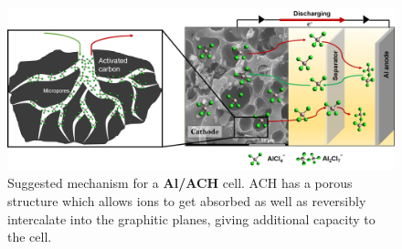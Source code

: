  \begin{figure}[tbh!]
  \centering
  \includegraphics[width=\textwidth]{Figures/chap5fig/achmech}
    \caption{Suggested mechanism for a \textbf{Al/ACH} cell. ACH has a porous structure which allows  ions to get absorbed as well as reversibly intercalate into the graphitic planes, giving additional capacity to the cell.}
  \label{Figures/chap5fig:achmech}
\end{figure}

